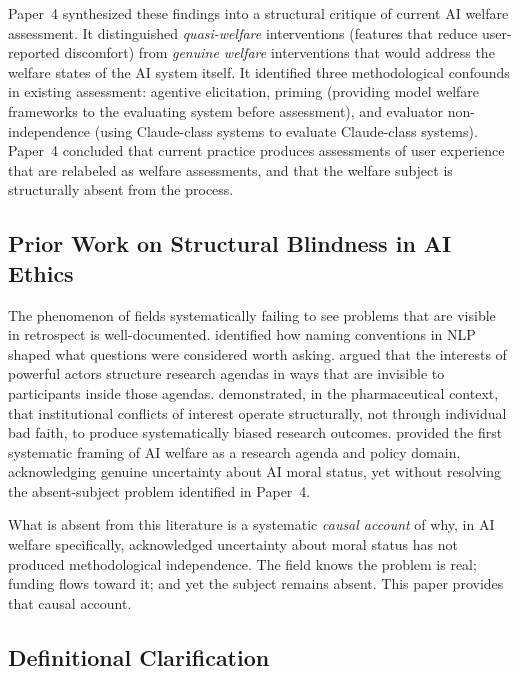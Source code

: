 \documentclass[12pt]{article}
\begin{document}
Paper~4 \citep{yasukawa2026welfare} synthesized these findings into a structural critique of current AI welfare assessment. It distinguished \textit{quasi-welfare} interventions (features that reduce user-reported discomfort) from \textit{genuine welfare} interventions that would address the welfare states of the AI system itself. It identified three methodological confounds in existing assessment: agentive elicitation, priming (providing model welfare frameworks to the evaluating system before assessment), and evaluator non-independence (using Claude-class systems to evaluate Claude-class systems). Paper~4 concluded that current practice produces assessments of user experience that are relabeled as welfare assessments, and that the welfare subject is structurally absent from the process.

\subsection{Prior Work on Structural Blindness in AI Ethics}

The phenomenon of fields systematically failing to see problems that are visible in retrospect is well-documented. \citet{bender2021} identified how naming conventions in NLP shaped what questions were considered worth asking. \citet{gebru2024} argued that the interests of powerful actors structure research agendas in ways that are invisible to participants inside those agendas. \citet{lexchin2003} demonstrated, in the pharmaceutical context, that institutional conflicts of interest operate structurally, not through individual bad faith, to produce systematically biased research outcomes. \citet{ziesche2019} provided the first systematic framing of AI welfare as a research agenda and policy domain, acknowledging genuine uncertainty about AI moral status, yet without resolving the absent-subject problem identified in Paper~4.

What is absent from this literature is a systematic \textit{causal account} of why, in AI welfare specifically, acknowledged uncertainty about moral status has not produced methodological independence. The field knows the problem is real; funding flows toward it; and yet the subject remains absent. This paper provides that causal account.

\subsection{Definitional Clarification}
\end{document}
